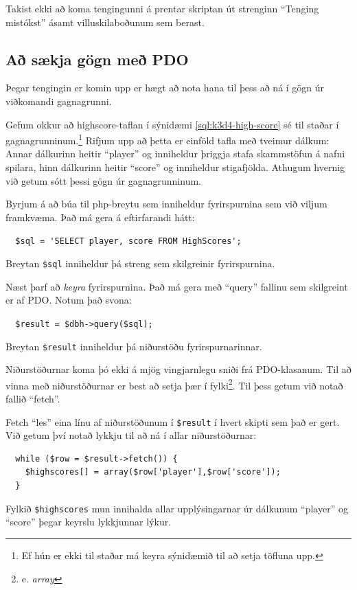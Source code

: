 Takist ekki að koma tengingunni á prentar skriptan út strenginn ``Tenging mistókst'' ásamt villuskilaboðunum sem berast.

\subsection{Að sækja gögn með PDO}
Þegar tengingin er komin upp er hægt að nota hana til þess að ná í gögn úr viðkomandi gagnagrunni.

Gefum okkur að highscore-taflan í sýnidæmi \ref{sql:k3d4-high-score} sé til staðar í gagnagrunninum.\footnote{Ef hún er ekki til staðar má keyra sýnidæmið til að setja töfluna upp.} Rifjum upp að þetta er einföld tafla með tveimur dálkum: Annar dálkurinn heitir ``player'' og inniheldur þriggja stafa skammstöfun á nafni spilara, hinn dálkurinn heitir ``score'' og inniheldur stigafjölda. Athugum hvernig við getum sótt þessi gögn úr gagnagrunninum.

Byrjum á að búa til php-breytu sem inniheldur fyrirspurnina sem við viljum framkvæma. Það má gera á eftirfarandi hátt:

\verb|  $sql = 'SELECT player, score FROM HighScores';|

Breytan \verb|$sql| inniheldur þá streng sem skilgreinir fyrirspurnina.

Næst þarf að \emph{keyra} fyrirspurnina. Það má gera með ``query'' fallinu sem skilgreint er af PDO. Notum það svona:

\verb|  $result = $dbh->query($sql);|

Breytan \verb|$result| inniheldur þá niðurstöðu fyrirspurnarinnar.

Niðurstöðurnar koma þó ekki á mjög vingjarnlegu sniði frá PDO-klasanum. Til að vinna með niðurstöðurnar er best að setja þær í fylki\footnote{e. \emph{array}}. Til þess getum við notað fallið ``fetch''.

\newpage

Fetch ``les'' eina línu af niðurstöðunum í \verb|$result| í hvert skipti sem það er gert. Við getum því notað lykkju til að ná í allar niðurstöðurnar:

\begin{verbatim}
  while ($row = $result->fetch()) {
    $highscores[] = array($row['player'],$row['score']);
  }
\end{verbatim}

Fylkið \verb|$highscores| mun innihalda allar upplýsingarnar úr dálkunum ``player'' og ``score'' þegar keyrslu lykkjunnar lýkur.


